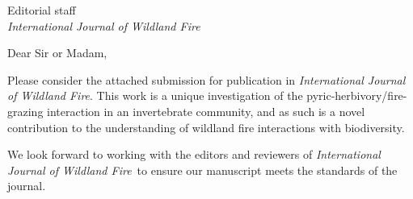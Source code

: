 \documentclass[parskip=half, 
			   fontsize=11pt,
			   paper=a4]				
{scrartcl}
\newcommand{\journal}{\emph{International Journal of Wildland Fire}}
\begin{document}
	\begin{letter}{Editorial staff\\
		\journal }
\setlength{\parindent}{12pt}

\opening{Dear Sir or Madam,}  
		
Please consider the attached submission for publication in \journal. 
This work is a unique investigation of the pyric-herbivory/fire-grazing interaction in an invertebrate community, and as such is a novel contribution to the understanding of wildland fire interactions with biodiversity. 

We look forward to working with the editors and reviewers of \journal~to ensure our manuscript meets the standards of the journal. 

\vspace{-3em} 
\closing{} %
\end{letter}
\end{document}

